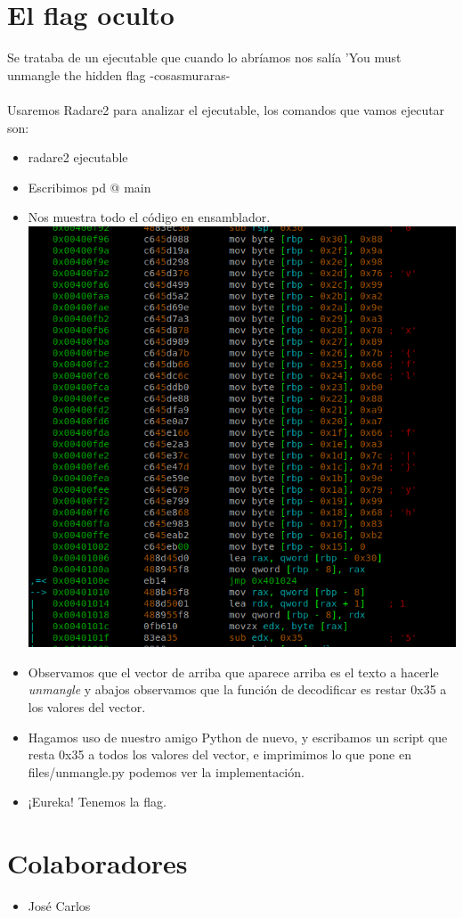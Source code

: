 \documentclass[11pt, spanish]{report}
\begin{document}
\section*{El flag oculto}
Se trataba de un ejecutable que cuando lo abríamos nos salía 'You must unmangle the hidden flag -cosasmuraras- \\ \\
Usaremos Radare2 para analizar el ejecutable, los comandos que vamos ejecutar son:
\begin{itemize}
	\item radare2 ejecutable
	\item Escribimos pd @ main
	\item Nos muestra todo el código en ensamblador. \\
	\includegraphics[width=\textwidth]{radare}
	\item Observamos que el vector de arriba que aparece arriba es el texto a hacerle \textit{unmangle} y abajos observamos que la función de decodificar es restar 0x35 a los valores del vector.
	\item Hagamos uso de nuestro amigo Python de nuevo, y escribamos un script que resta 0x35 a todos los valores del vector, e imprimimos lo que pone en files/unmangle.py podemos ver la implementación.
	\item ¡Eureka! Tenemos la flag.
\end{itemize}
\section*{Colaboradores}
\begin{itemize}
	\item José Carlos
\end{itemize}
\end{document}
